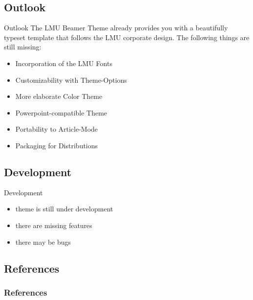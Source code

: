 \documentclass[fleqn,compress,utf8,aspectratio=169,t]{beamer}
\begin{document}
\subsection{Outlook}

\begin{frame}{Outlook}
  The LMU Beamer Theme already provides you with a beautifully typeset template
  that follows the LMU corporate design. The following things are still missing:
  \begin{itemize}
    \item<2-> Incorporation of the LMU Fonts
    \item<3-> Customizability with Theme-Options
    \item<4-> More elaborate Color Theme
    \item<5-> Powerpoint-compatible Theme
    \item<6-> Portability to Article-Mode
    \item<7-> Packaging for Distributions
  \end{itemize}

\end{frame}

\subsection{Development}

\begin{frame}{Development}
  \begin{itemize}
    \item<1-> theme is still under development
    \item<2-> there are missing features
    \item<3-> there may be bugs
  \end{itemize}
\end{frame}

\subsection{References}
\begin{frame}[allowframebreaks]
  \frametitle{References}
  \printbibliography[heading=none]
\end{frame}
\end{document}
